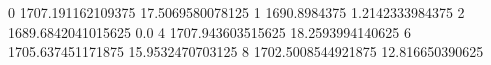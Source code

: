 0 1707.191162109375 17.5069580078125
1 1690.8984375 1.2142333984375
2 1689.6842041015625 0.0
4 1707.943603515625 18.2593994140625
6 1705.637451171875 15.9532470703125
8 1702.5008544921875 12.816650390625
